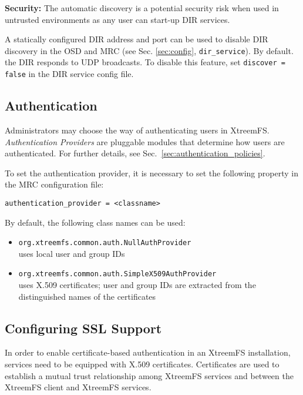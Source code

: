 \documentclass[a4paper,10pt]{book}
\begin{document}
\textbf{Security:} The automatic discovery is a potential security risk when used in untrusted environments as any user can start-up DIR services.

A statically configured DIR address and port can be used to disable DIR discovery in the OSD and MRC (see Sec. \ref{sec:config}, \texttt{dir\_service}). By default. the DIR responds to UDP broadcasts. To disable this feature, set  \texttt{discover = false} in the DIR service config file.


\subsection{Authentication}
\label{sec:AuthProvider}
Administrators may choose the way of authenticating users in XtreemFS. \emph{Authentication Providers} are pluggable modules that determine how users are authenticated. For further details, see Sec.\ \ref{sec:authentication_policies}.

To set the authentication provider, it is necessary to set the following property in the MRC configuration file:

\begin{verbatim}
authentication_provider = <classname>
\end{verbatim}

By default, the following class names can be used:

\begin{itemize}
 \item \texttt{org.xtreemfs.common.auth.NullAuthProvider}\\
uses local user and group IDs
 \item \texttt{org.xtreemfs.common.auth.SimpleX509AuthProvider}\\
uses X.509 certificates; user and group IDs are extracted from the distinguished names of the certificates
\end{itemize}


\subsection{Configuring SSL Support}
\label{sec:cfg_ssl}

In order to enable certificate-based authentication in an XtreemFS installation, services need to be equipped with X.509 certificates. Certificates are used to establish a mutual trust relationship among XtreemFS services and between the XtreemFS client and XtreemFS services.
\end{document}
